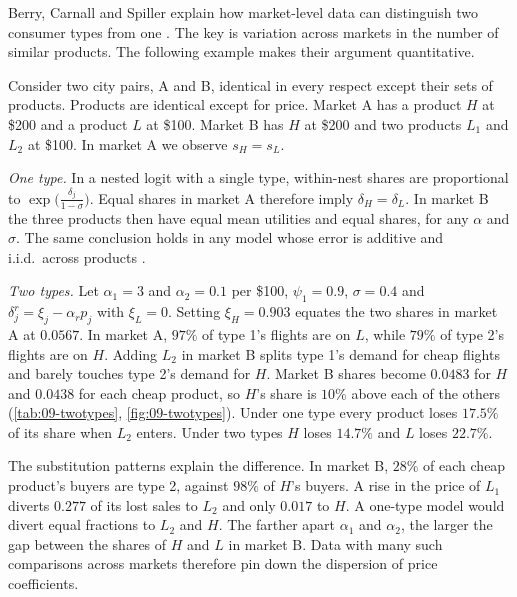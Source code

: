 Berry, Carnall and Spiller explain how market-level data can distinguish two consumer types from one
\citep[pp.~18--19]{BerryCarnallSpiller2006}. The key is variation across markets in the number of similar
products. The following example makes their argument quantitative.

\begin{example}\label{ex:09-twotypes}
Consider two city pairs, A and B, identical in every respect except their sets of products. Products are
identical except for price. Market A has a product $H$ at \$200 and a product $L$ at \$100. Market B has
$H$ at \$200 and two products $L_1$ and $L_2$ at \$100. In market A we observe $s_H=s_L$.

\emph{One type.} In a nested logit with a single type, within-nest shares are proportional to
$\exp\big(\frac{\delta_j}{1-\sigma}\big)$. Equal shares in market A therefore imply $\delta_H=\delta_L$. In market B
the three products then have equal mean utilities and equal shares, for any $\alpha$ and $\sigma$. The
same conclusion holds in any model whose error is additive and i.i.d.\ across products
\citep[p.~18]{BerryCarnallSpiller2006}.

\emph{Two types.} Let $\alpha_1=3$ and $\alpha_2=0.1$ per \$100, $\psi_1=0.9$, $\sigma=0.4$ and
$\delta^r_j=\xi_j-\alpha_rp_j$ with $\xi_L=0$. Setting $\xi_H=0.903$ equates the two shares in market A
at $0.0567$. In market A, $97\%$ of type 1's flights are on $L$, while $79\%$ of type 2's flights are on
$H$. Adding $L_2$ in market B splits type 1's demand for cheap flights and barely touches type 2's demand
for $H$. Market B shares become $0.0483$ for $H$ and $0.0438$ for each cheap product, so $H$'s share is
$10\%$ above each of the others (\cref{tab:09-twotypes}, \cref{fig:09-twotypes}). Under one type every
product loses $17.5\%$ of its share when $L_2$ enters. Under two types $H$ loses $14.7\%$ and $L$ loses
$22.7\%$.

The substitution patterns explain the difference. In market B, $28\%$ of each cheap product's buyers are
type 2, against $98\%$ of $H$'s buyers. A rise in the price of $L_1$ diverts $0.277$ of its lost sales to
$L_2$ and only $0.017$ to $H$. A one-type model would divert equal fractions to $L_2$ and $H$. The farther
apart $\alpha_1$ and $\alpha_2$, the larger the gap between the shares of $H$ and $L$ in market B. Data
with many such comparisons across markets therefore pin down the dispersion of price coefficients.


\end{example}
